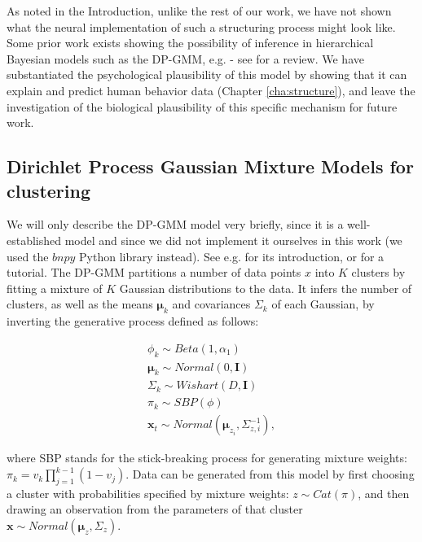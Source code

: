 As noted in the Introduction, unlike the rest of our work, we have not shown what the neural implementation of such a structuring process might look like. Some prior work exists showing the possibility of inference in hierarchical Bayesian models such as the DP-GMM, e.g. \citep{shi2009neural} - see \citep{sanborn2015types} for a review. We have substantiated the psychological plausibility of this model by showing that it can explain and predict human behavior data (Chapter \ref{cha:structure}), and leave the investigation of the biological plausibility of this specific mechanism for future work.

\subsection{Dirichlet Process Gaussian Mixture Models for clustering}

We will only describe the DP-GMM model very briefly, since it is a well-established model and since we did not implement it ourselves in this work (we used the $bnpy$ Python library instead). See e.g. \citep{rasmussen1999infinite} for its introduction, or \citep{gershman2012tutorial} for a tutorial. The DP-GMM partitions a number of data points $x$ into $K$ clusters by fitting a mixture of $K$ Gaussian distributions to the data. It infers the number of clusters, as well as the means $\bm \mu_k$ and covariances $\Sigma_k$ of each Gaussian, by inverting the generative process defined as follows:
 
\begin{equation}
\label{eq:dpgmm}
\begin{array}{rcl}
\phi_k   \sim Beta(1, \alpha_1) \\
\bm \mu_k    \sim Normal(0,  \mathbf{I}) \\
\Sigma_k \sim Wishart(D, \mathbf{I}) \\
\pi_{k}  \sim SBP(\phi) \\
\bm x_t \sim Normal(\bm \mu_{z_i},  \Sigma_{z,i}^{-1}),
\end{array}
\end{equation}

\noindent where SBP stands for the stick-breaking process for generating mixture weights: $\pi_k=v_k \prod_{j=1}^{k-1} (1-v_j)$. Data can be generated from this model by first choosing a cluster with probabilities specified by mixture weights: $z \sim Cat(\pi)$, and then drawing an observation from the parameters of that cluster $\bm x \sim Normal(\bm \mu_z, \Sigma_z)$.

